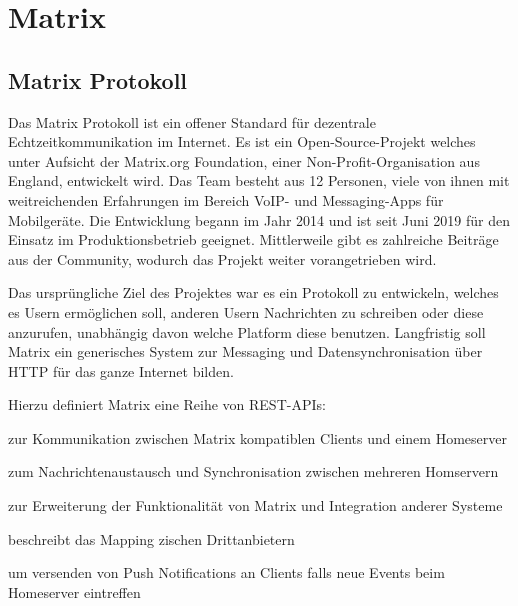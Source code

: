     \newpage
    \section{Matrix}\label{sec:matrix}

    \subsection{Matrix Protokoll}\label{subsec:matrix-protokoll}
    Das Matrix Protokoll ist ein offener Standard für dezentrale Echtzeitkommunikation im Internet.
    Es ist ein Open-Source-Projekt welches unter Aufsicht der Matrix.org Foundation, einer Non-Profit-Organisation aus England, entwickelt wird.
    Das Team besteht aus 12 Personen, viele von ihnen mit weitreichenden Erfahrungen im Bereich VoIP- und Messaging-Apps für Mobilgeräte.
    Die Entwicklung begann im Jahr 2014 und ist seit Juni 2019 für den Einsatz im Produktionsbetrieb geeignet.
    Mittlerweile gibt es zahlreiche Beiträge aus der Community, wodurch das Projekt weiter vorangetrieben wird.
    ~\cite{matrixfaq}

    Das ursprüngliche Ziel des Projektes war es ein Protokoll zu entwickeln, welches es Usern ermöglichen soll, anderen Usern Nachrichten zu schreiben oder diese anzurufen, unabhängig davon welche Platform diese benutzen.
    Langfristig soll Matrix ein generisches System zur Messaging und Datensynchronisation über HTTP für das ganze Internet bilden.
    ~\cite{matrixfaq}

    Hierzu definiert Matrix eine Reihe von REST-APIs:
    \begin{description}[leftmargin=!,labelwidth=5.5cm]
        \item [Client-Server-API\footnotemark]  zur Kommunikation zwischen Matrix kompatiblen Clients und einem Homeserver
        \item [Server-Server-API\footnotemark]  zum Nachrichtenaustausch und Synchronisation zwischen mehreren Homservern
        \item [Application-Service-API\footnotemark]  zur Erweiterung der Funktionalität von Matrix und Integration anderer Systeme
        \item [Identity-Service-API\footnotemark]  beschreibt das Mapping zischen Drittanbietern
        \item [Push-Gateway-API\footnotemark]  um versenden von Push Notifications an Clients falls neue Events beim Homeserver eintreffen
    \end{description}



